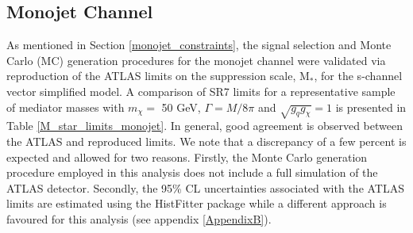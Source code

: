 \subsection{Monojet Channel}
\label{monojet_validation}
\begin{flushleft}
As mentioned in Section \ref{monojet_constraints}, the signal selection and Monte Carlo (MC) generation procedures for the monojet channel were validated via reproduction of the ATLAS limits on the suppression scale, M$_{*}$, for the s-channel vector simplified model. A comparison of SR7 limits for a representative sample of mediator masses with $m_{\chi} = $ 50 GeV, $\Gamma = M/8\pi$ and $\sqrt{g_{q}g_{\chi}} = 1$ is presented in Table \ref{M_star_limits_monojet}. In general, good agreement is observed between the ATLAS and reproduced limits. We note that a discrepancy of a few percent is expected and allowed for two reasons. Firstly, the Monte Carlo generation procedure employed in this analysis does not include a full simulation of the ATLAS detector.  Secondly, the 95\% CL uncertainties associated with the ATLAS limits are estimated using the HistFitter package while a different approach is favoured for this analysis (see appendix \ref{AppendixB}). 




\end{flushleft}
